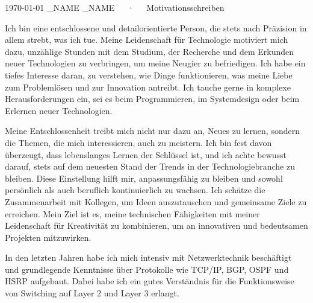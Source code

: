 \documentclass[11pt, a4paper]{awesome-cv}
\begin{document}
\makecvheader[R]

\makecvfooter
  {\today}
  {\FIRST_NAME \LAST_NAME~~~·~~~Motivationsschreiben}
  {}

\makelettertitle

\begin{cvletter}
	


Ich bin eine entschlossene und detailorientierte Person, die stets nach Präzision in allem strebt, was ich tue. Meine Leidenschaft für Technologie motiviert mich dazu, unzählige Stunden mit dem Studium, der Recherche und dem Erkunden neuer Technologien zu verbringen, um meine Neugier zu befriedigen. Ich habe ein tiefes Interesse daran, zu verstehen, wie Dinge funktionieren, was meine Liebe zum Problemlösen und zur Innovation antreibt. Ich tauche gerne in komplexe Herausforderungen ein, sei es beim Programmieren, im Systemdesign oder beim Erlernen neuer Technologien.

Meine Entschlossenheit treibt mich nicht nur dazu an, Neues zu lernen, sondern die Themen, die mich interessieren, auch zu meistern. Ich bin fest davon überzeugt, dass lebenslanges Lernen der Schlüssel ist, und ich achte bewusst darauf, stets auf dem neuesten Stand der Trends in der Technologiebranche zu bleiben. Diese Einstellung hilft mir, anpassungsfähig zu bleiben und sowohl persönlich als auch beruflich kontinuierlich zu wachsen. Ich schätze die Zusammenarbeit mit Kollegen, um Ideen auszutauschen und gemeinsame Ziele zu erreichen. Mein Ziel ist es, meine technischen Fähigkeiten mit meiner Leidenschaft für Kreativität zu kombinieren, um an innovativen und bedeutsamen Projekten mitzuwirken.


In den letzten Jahren habe ich mich intensiv mit Netzwerktechnik beschäftigt und grundlegende Kenntnisse über Protokolle wie TCP/IP, BGP, OSPF und HSRP aufgebaut. Dabei habe ich ein gutes Verständnis für die Funktionsweise von Switching auf Layer 2 und Layer 3 erlangt.


\end{cvletter}
\end{document}
